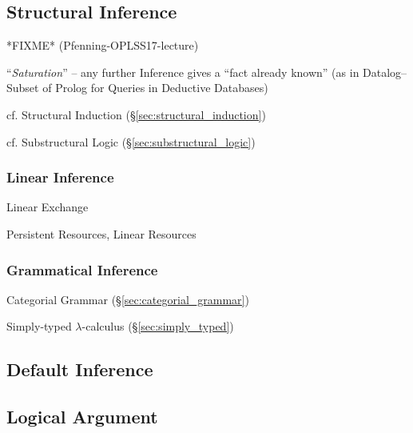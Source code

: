\subsection{Structural Inference}\label{sec:structural_inference}

*FIXME* (Pfenning-OPLSS17-lecture)

``\emph{Saturation}'' -- any further Inference gives a ``fact already
known'' (as in Datalog-- Subset of Prolog for Queries in Deductive
Databases)

\fist cf. Structural Induction (\S\ref{sec:structural_induction})

\fist cf. Substructural Logic (\S\ref{sec:substructural_logic})



\subsubsection{Linear Inference}\label{sec:linear_inference}

Linear Exchange

Persistent Resources, Linear Resources



\subsubsection{Grammatical Inference}\label{sec:grammatical_inference}

\fist Categorial Grammar (\S\ref{sec:categorial_grammar})

\fist Simply-typed $\lambda$-calculus (\S\ref{sec:simply_typed})



\subsection{Default Inference}\label{sec:default_inference}

\subsection{Logical Argument}\label{sec:logical_argument}

